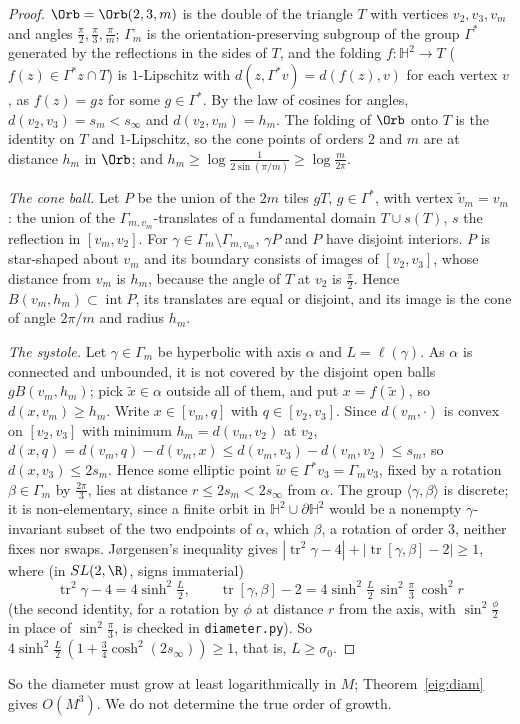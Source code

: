 \begin{proof}
$\Orb=\Orb(2,3,m)$ is the double of the triangle $T$ with vertices $v_2,v_3,v_m$ and angles $\frac\pi2,\frac\pi3,\frac\pi m$; $\Gamma_m$ is the orientation-preserving subgroup of the group $\Gamma^*$ generated by the reflections in the sides of $T$, and the folding $f:\mathbb H^2\to T$ ($f(z)\in\Gamma^*z\cap T$) is $1$-Lipschitz with $d(z,\Gamma^*v)=d(f(z),v)$ for each vertex $v$, as $f(z)=gz$ for some $g\in\Gamma^*$. By the law of cosines for angles, $d(v_2,v_3)=s_m<s_\infty$ and $d(v_2,v_m)=h_m$. The folding of $\Orb$ onto $T$ is the identity on $T$ and $1$-Lipschitz, so the cone points of orders $2$ and $m$ are at distance $h_m$ in $\Orb$; and $h_m\ge\log\frac1{2\sin(\pi/m)}\ge\log\frac m{2\pi}$.

\emph{The cone ball.} Let $P$ be the union of the $2m$ tiles $gT$, $g\in\Gamma^*$, with vertex $\tilde v_m=v_m$: the union of the $\Gamma_{m,v_m}$-translates of a fundamental domain $T\cup s(T)$, $s$ the reflection in $[v_m,v_2]$. For $\gamma\in\Gamma_m\setminus\Gamma_{m,v_m}$, $\gamma P$ and $P$ have disjoint interiors. $P$ is star-shaped about $v_m$ and its boundary consists of images of $[v_2,v_3]$, whose distance from $v_m$ is $h_m$, because the angle of $T$ at $v_2$ is $\frac\pi2$. Hence $B(v_m,h_m)\subset\operatorname{int}P$, its translates are equal or disjoint, and its image is the cone of angle $2\pi/m$ and radius $h_m$.

\emph{The systole.} Let $\gamma\in\Gamma_m$ be hyperbolic with axis $\alpha$ and $L=\ell(\gamma)$. As $\alpha$ is connected and unbounded, it is not covered by the disjoint open balls $gB(v_m,h_m)$; pick $\tilde x\in\alpha$ outside all of them, and put $x=f(\tilde x)$, so $d(x,v_m)\ge h_m$. Write $x\in[v_m,q]$ with $q\in[v_2,v_3]$. Since $d(v_m,\cdot)$ is convex on $[v_2,v_3]$ with minimum $h_m=d(v_m,v_2)$ at $v_2$, $d(x,q)=d(v_m,q)-d(v_m,x)\le d(v_m,v_3)-d(v_m,v_2)\le s_m$, so $d(x,v_3)\le2s_m$. Hence some elliptic point $\tilde w\in\Gamma^*v_3=\Gamma_mv_3$, fixed by a rotation $\beta\in\Gamma_m$ by $\frac{2\pi}3$, lies at distance $r\le2s_m<2s_\infty$ from $\alpha$. The group $\langle\gamma,\beta\rangle$ is discrete; it is non-elementary, since a finite orbit in $\mathbb H^2\cup\partial\mathbb H^2$ would be a nonempty $\gamma$-invariant subset of the two endpoints of $\alpha$, which $\beta$, a rotation of order $3$, neither fixes nor swaps. Jørgensen's inequality \cite{jorgensen1976} gives $|\operatorname{tr}^2\gamma-4|+|\operatorname{tr}[\gamma,\beta]-2|\ge1$, where (in $SL(2,\R)$, signs immaterial)
\[
  \operatorname{tr}^2\gamma-4=4\sinh^2\tfrac L2,\qquad \operatorname{tr}[\gamma,\beta]-2=4\sinh^2\tfrac L2\,\sin^2\tfrac\pi3\,\cosh^2r
\]
(the second identity, for a rotation by $\phi$ at distance $r$ from the axis, with $\sin^2\frac\phi2$ in place of $\sin^2\frac\pi3$, is checked in \texttt{diameter.py}). So $4\sinh^2\frac L2\,(1+\frac34\cosh^2(2s_\infty))\ge1$, that is, $L\ge\sigma_0$.
\end{proof}

So the diameter must grow at least logarithmically in $M$; Theorem~\ref{eig:diam} gives $O(M^3)$. We do not determine the true order of growth.
